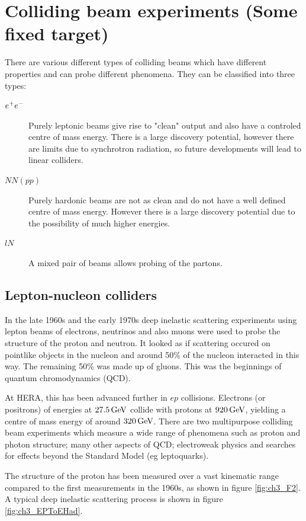 \section{Colliding beam experiments (Some fixed target)}

There are various different types of colliding beams which have different properties and can probe different phenomena.  They can be classified into three types:

\begin{description}
  \item[$e^+ e^-$] Purely leptonic beams give rise to "clean" output and also have a controled centre of mass energy.  There is a large discovery potential, however there are limits due to synchrotron  radiation, so future developments will lead to linear colliders.
  \item[$NN(pp)$]   Purely hardonic beams are not as clean and do not have a well defined centre of mass energy.  However there is a large discovery potential due to the possibility of much higher energies.
  \item[$lN$]      A mixed pair of beams allows probing of the partons.
\end{description}

\subsection{Lepton-nucleon colliders}

In the late 1960s and the early 1970s deep inelastic scattering experiments using lepton beams of electrons, neutrinos and also muons were used to probe the structure of the proton and neutron.  It looked as if scattering occured on pointlike objects in the nucleon and around 50\% of the nucleon interacted in this way.  The remaining 50\% was made up of gluons.  This was the beginnings of quantum chromodynamics (QCD).

At HERA, this has been advanced further in $ep$ collisions.  Electrons (or positrons) of energies at $27.5 \mathrm{\,GeV}$ collide with protons at $920 \mathrm{\,GeV}$, yielding a centre of mass energy of around $320 \mathrm{\,GeV}$.  There are two multipurpose colliding beam experiments which measure a wide range of phenomena such as proton and photon structure; many other aspects of QCD; electroweak physics and searches for effects beyond the Standard Model (eg leptoquarks).

The structure of the proton has been measured over a vast kinematic range compared to the first measurements in the 1960s, as shown in figure \ref{fig:ch3_F2}.  A typical deep inelastic scattering process is shown in figure \ref{fig:ch3_EPToEHad}.


